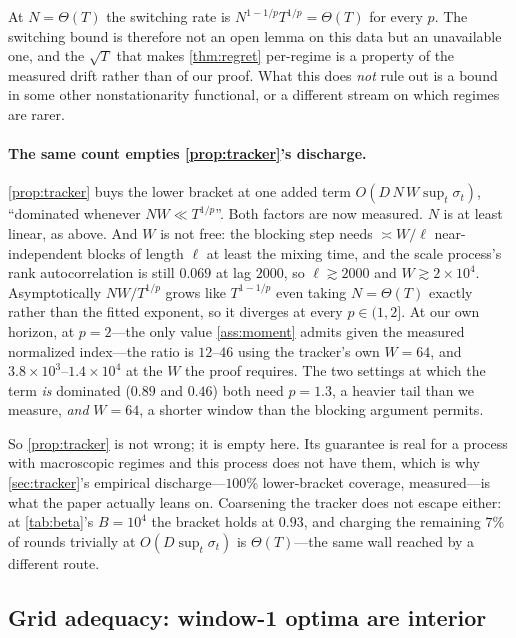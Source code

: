 \documentclass{article}
\begin{document}
At $N=\Theta(T)$ the switching rate is $N^{1-1/p}T^{1/p}=\Theta(T)$ for every $p$. The switching
bound is therefore not an open lemma on this data but an unavailable one, and the $\sqrt T$ that
makes \cref{thm:regret} per-regime is a property of the measured drift rather than of our proof.
What this does \emph{not} rule out is a bound in some other nonstationarity functional, or a
different stream on which regimes are rarer.

\paragraph{The same count empties \cref{prop:tracker}'s discharge.} \cref{prop:tracker} buys the
lower bracket at one added term $O(D\,N\,W\sup_t\sigma_t)$, ``dominated whenever $NW\ll
T^{1/p}$''. Both factors are now measured. $N$ is at least linear, as above. And $W$ is not free:
the blocking step needs ${\asymp}W/\ell$ near-independent blocks of length $\ell$ at least the
mixing time, and the scale process's rank autocorrelation is still $0.069$ at lag $2000$, so
$\ell\gtrsim2000$ and $W\gtrsim2\!\times\!10^4$. Asymptotically $NW/T^{1/p}$ grows like
$T^{1-1/p}$ even taking $N=\Theta(T)$ exactly rather than the fitted exponent, so it diverges at
every $p\in(1,2]$. At our own horizon, at $p{=}2$---the only value \cref{ass:moment} admits given
the measured normalized index---the ratio is $12$--$46$ using the tracker's own $W{=}64$, and
$3.8\!\times\!10^3$--$1.4\!\times\!10^4$ at the $W$ the proof requires. The two settings at which
the term \emph{is} dominated ($0.89$ and $0.46$) both need $p{=}1.3$, a heavier tail than we
measure, \emph{and} $W{=}64$, a shorter window than the blocking argument permits.

So \cref{prop:tracker} is not wrong; it is empty here. Its guarantee is real for a process with
macroscopic regimes and this process does not have them, which is why \cref{sec:tracker}'s
empirical discharge---$100\%$ lower-bracket coverage, measured---is what the paper actually
leans on. Coarsening the tracker does not escape either: at \cref{tab:beta}'s $B{=}10^4$ the
bracket holds at $0.93$, and charging the remaining $7\%$ of rounds trivially at
$O(D\sup_t\sigma_t)$ is $\Theta(T)$---the same wall reached by a different route.

\subsection{Grid adequacy: window-1 optima are interior}
\label{app:grid}
\end{document}
